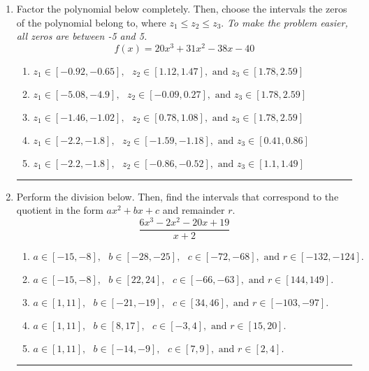\documentclass[14pt]{extbook}
\newcommand{\litem}[1]{\item#1\hspace*{-1cm}\rule{\textwidth}{0.4pt}}
\begin{document}
\begin{enumerate}
{\begin{enumerate}[label=\Alph*.]
\end{enumerate} }
\litem{
Factor the polynomial below completely. Then, choose the intervals the zeros of the polynomial belong to, where $z_1 \leq z_2 \leq z_3$. \textit{To make the problem easier, all zeros are between -5 and 5.}\[ f(x) = 20x^{3} +31 x^{2} -38 x -40 \]\begin{enumerate}[label=\Alph*.]
\item \( z_1 \in [-0.92, -0.65], \text{   }  z_2 \in [1.12, 1.47], \text{   and   } z_3 \in [1.78, 2.59] \)
\item \( z_1 \in [-5.08, -4.9], \text{   }  z_2 \in [-0.09, 0.27], \text{   and   } z_3 \in [1.78, 2.59] \)
\item \( z_1 \in [-1.46, -1.02], \text{   }  z_2 \in [0.78, 1.08], \text{   and   } z_3 \in [1.78, 2.59] \)
\item \( z_1 \in [-2.2, -1.8], \text{   }  z_2 \in [-1.59, -1.18], \text{   and   } z_3 \in [0.41, 0.86] \)
\item \( z_1 \in [-2.2, -1.8], \text{   }  z_2 \in [-0.86, -0.52], \text{   and   } z_3 \in [1.1, 1.49] \)

\end{enumerate} }
\litem{
Perform the division below. Then, find the intervals that correspond to the quotient in the form $ax^2+bx+c$ and remainder $r$.\[ \frac{6x^{3} -2 x^{2} -20 x + 19}{x + 2} \]\begin{enumerate}[label=\Alph*.]
\item \( a \in [-15, -8], \text{   } b \in [-28, -25], \text{   } c \in [-72, -68], \text{   and   } r \in [-132, -124]. \)
\item \( a \in [-15, -8], \text{   } b \in [22, 24], \text{   } c \in [-66, -63], \text{   and   } r \in [144, 149]. \)
\item \( a \in [1, 11], \text{   } b \in [-21, -19], \text{   } c \in [34, 46], \text{   and   } r \in [-103, -97]. \)
\item \( a \in [1, 11], \text{   } b \in [8, 17], \text{   } c \in [-3, 4], \text{   and   } r \in [15, 20]. \)
\item \( a \in [1, 11], \text{   } b \in [-14, -9], \text{   } c \in [7, 9], \text{   and   } r \in [2, 4]. \)


\end{enumerate}}
\end{enumerate}
\end{document}
